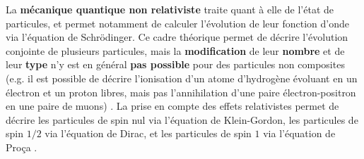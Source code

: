 \begin{refsection}
La \textbf{mécanique quantique non relativiste} traite quant à elle de l'état de particules, et permet notamment de calculer l'évolution de leur fonction d'onde via l'équation de Schrödinger. Ce cadre théorique permet de décrire l'évolution conjointe de plusieurs particules, mais la \textbf{modification} de leur \textbf{nombre} et de leur \textbf{type} n'y est en général \textbf{pas possible} pour des particules non composites (e.g. il est possible de décrire l'ionisation d'un atome d'hydrogène évoluant en un électron et un proton libres, mais pas l'annihilation d'une paire électron-positron en une paire de muons) \parencite{klauber_2015}. La prise en compte des effets relativistes permet de décrire les particules de spin nul via l'équation de Klein-Gordon, les particules de spin $1/2$ via l'équation de Dirac, et les particules de spin $1$ via l'équation de Proça \parencite{klauber_2015}.


\end{refsection}
